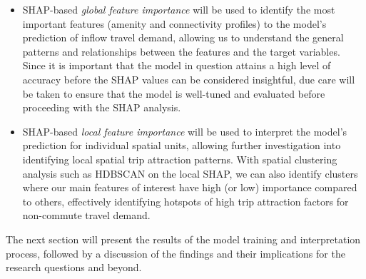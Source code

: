 \begin{itemize}
\setlength\itemsep{0em} 
    \item SHAP-based \textit{global feature importance} will be used to identify the most important features (amenity and connectivity profiles) to the model's prediction of inflow travel demand, allowing us to understand the general patterns and relationships between the features and the target variables. Since it is important that the model in question attains a high level of accuracy before the SHAP values can be considered insightful, due care will be taken to ensure that the model is well-tuned and evaluated before proceeding with the SHAP analysis.
    \item SHAP-based \textit{local feature importance} will be used to interpret the model's prediction for individual spatial units, allowing further investigation into identifying local spatial trip attraction patterns. With spatial clustering analysis such as HDBSCAN on the local SHAP, we can also identify clusters where our main features of interest have high (or low) importance compared to others, effectively identifying hotspots of high trip attraction factors for non-commute travel demand.
\end{itemize}

The next section will present the results of the model training and interpretation process, followed by a discussion of the findings and their implications for the research questions and beyond.

